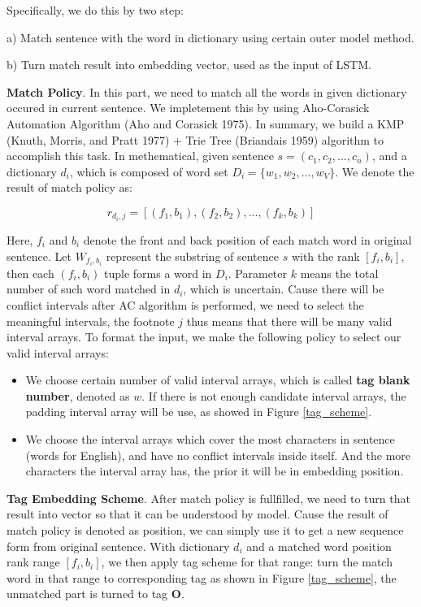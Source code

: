 \documentclass[letterpaper]{article} %
\begin{document}
Specifically, we do this by two step: 

a)  Match sentence with the word in dictionary using certain outer model method.

b)  Turn match result into embedding vector, used as the input of LSTM.

\textbf{Match Policy}. In this part, we need to match all the words in given dictionary occured in current sentence. We impletement this by using Aho-Corasick Automation Algorithm (Aho and Corasick 1975). In summary, we build a KMP (Knuth, Morris, and Pratt 1977) + Trie Tree (Briandais 1959) algorithm to accomplish this task. In methematical, given sentence $s = (c_1, c_2, ..., c_n) $, and a dictionary $d_i$, which is composed of word set $D_i=\{w_1, w_2, ..., w_V\}$. We denote the result of match policy as:

\begin{equation}
r_{d_i, j} = [ (f_1, b_1), (f_2 , b_2), ..., (f_k, b_k) ] \label{match_result}
\end{equation}

Here, $f_i$ and $b_i$ denote the front and back position of each match word in original sentence. Let $W_{f_i,b_i}$ represent the substring of sentence $s$ with the rank $[f_i, b_i]$, then each $(f_i, b_i)$ tuple forms a word in $D_i$. Parameter $k$ means the total number of such word matched in $d_i$, which is uncertain. Cause there will be conflict intervals after AC algorithm is performed, we need to select the meaningful intervals, the footnote $j$ thus means that there will be many valid interval arrays. To format the input, we make the following policy to select our valid interval arrays:

\begin{itemize}
\item We choose certain number of valid interval arrays, which is called \textbf{tag blank number}, denoted as $w$. If there is not enough candidate interval arrays, the padding interval array will be use, as showed in Figure \ref{tag_scheme}. 
\item We choose the interval arrays which cover the most characters in sentence (words for English), and have no conflict intervals inside itself. And the more characters the interval array has, the prior it will be in embedding position.
\end{itemize}

\textbf{Tag Embedding Scheme}. After match policy is fullfilled, we need to turn that result into vector so that it can be understood by model. Cause the result of match policy is denoted as position, we can simply use it to get a new sequence form from original sentence. With dictionary $d_i$ and a matched word position rank range $[f_i, b_i]$, we then apply tag scheme for that range: turn the match word in that range to corresponding tag as shown in Figure \ref{tag_scheme}, the unmatched part is turned to tag \textbf{O}.
\end{document}
